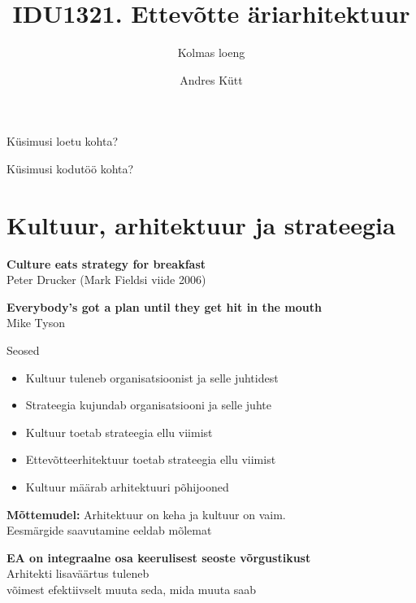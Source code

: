 \documentclass{beamer}
\title{IDU1321. Ettevõtte äriarhitektuur}
\subtitle{Kolmas loeng}
\author{Andres Kütt}
\institute{Cybernetica, arhitekt}
\begin{document}
\begin{frame}
\titlepage
\end{frame}

\begin{frame}[standout]
Küsimusi loetu kohta?
\end{frame}


\begin{frame}[standout]
Küsimusi kodutöö kohta?
\end{frame}

\section{Kultuur, arhitektuur ja strateegia}
\begin{frame}[fragile]
	\begin{center}
		\LARGE{\textbf{Culture eats strategy for breakfast}}
		\\[4cm]
		\small{Peter Drucker (Mark Fieldsi viide 2006)}
	\end{center}
\end{frame}

\begin{frame}[fragile]
	\begin{center}
		\LARGE{\textbf{Everybody's got a plan until they get hit in the mouth}}
		\\[4cm]
		\small{Mike Tyson}
	\end{center}
\end{frame}


\begin{frame}{Seosed}
	\begin{itemize}
		\item Kultuur tuleneb organisatsioonist ja selle juhtidest
		\item Strateegia kujundab organisatsiooni ja selle juhte
		\item Kultuur toetab strateegia ellu viimist
		\item Ettevõtteerhitektuur toetab strateegia ellu viimist
		\item Kultuur määrab arhitektuuri põhijooned
	\end{itemize}
	
	\begin{center}
		\textbf{Mõttemudel:} Arhitektuur on keha ja kultuur on vaim. \\Eesmärgide saavutamine eeldab mõlemat
	\end{center}
\end{frame}

\begin{frame}[fragile]
	\begin{center}
		\LARGE{\textbf{EA on integraalne osa keerulisest seoste võrgustikust}}
		\\[4cm]
		\small{Arhitekti lisaväärtus tuleneb \\võimest efektiivselt muuta seda, mida muuta saab}
	\end{center}
\end{frame}
\end{document}
